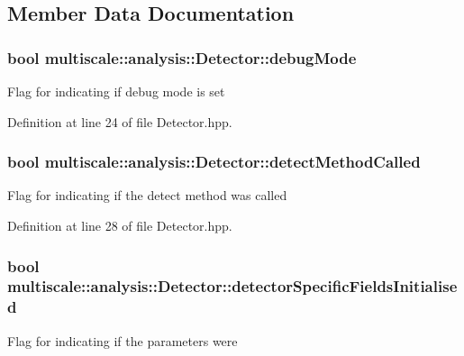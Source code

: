 \subsection{Member Data Documentation}
\hypertarget{classmultiscale_1_1analysis_1_1Detector_a4b42f796957efd6ee0b8cf7645494a65}{
\subsubsection[{debug\-Mode}]{\setlength{\rightskip}{0pt plus 5cm}bool multiscale\-::analysis\-::\-Detector\-::debug\-Mode\hspace{0.3cm}{\ttfamily [protected]}}}\label{classmultiscale_1_1analysis_1_1Detector_a4b42f796957efd6ee0b8cf7645494a65}
Flag for indicating if debug mode is set 

Definition at line 24 of file Detector.\-hpp.

\hypertarget{classmultiscale_1_1analysis_1_1Detector_ad565f471d9d7db7692da588ff0d6be2f}{
\subsubsection[{detect\-Method\-Called}]{\setlength{\rightskip}{0pt plus 5cm}bool multiscale\-::analysis\-::\-Detector\-::detect\-Method\-Called\hspace{0.3cm}{\ttfamily [protected]}}}\label{classmultiscale_1_1analysis_1_1Detector_ad565f471d9d7db7692da588ff0d6be2f}
Flag for indicating if the detect method was called 

Definition at line 28 of file Detector.\-hpp.

\hypertarget{classmultiscale_1_1analysis_1_1Detector_a172b91067670a14a7707f24dc218f2af}{
\subsubsection[{detector\-Specific\-Fields\-Initialised}]{\setlength{\rightskip}{0pt plus 5cm}bool multiscale\-::analysis\-::\-Detector\-::detector\-Specific\-Fields\-Initialised\hspace{0.3cm}{\ttfamily [protected]}}}\label{classmultiscale_1_1analysis_1_1Detector_a172b91067670a14a7707f24dc218f2af}
Flag for indicating if the parameters were 

